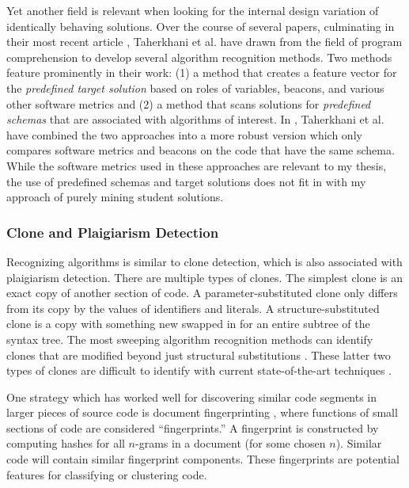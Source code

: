 Yet another field is relevant when looking for the internal design variation of identically behaving solutions. Over the course of several papers, culminating in their most recent article \cite{taherkhani13}, Taherkhani et al. have drawn from the field of program comprehension to develop several algorithm recognition methods. Two methods feature prominently in their work: (1) a method that creates a feature vector for the \emph{predefined target solution} based on roles of variables, beacons, and various other software metrics and (2) a method that scans solutions for \emph{predefined schemas} that are associated with algorithms of interest. In \cite{taherkhani13}, Taherkhani et al. have combined the two approaches into a more robust version which only compares software metrics and beacons on the code that have the same schema. While the software metrics used in these approaches are relevant to my thesis, the use of predefined schemas and target solutions does not fit in with my approach of purely mining student solutions.

\subsubsection{Clone and Plaigiarism Detection}

Recognizing algorithms is similar to clone detection, which is also associated with plaigiarism detection. There are multiple types of clones. The simplest clone is an exact copy of another section of code. A parameter-substituted clone only differs from its copy by the values of identifiers and literals. A structure-substituted clone is a copy with something new swapped in for an entire subtree of the syntax tree. The most sweeping algorithm recognition methods can identify clones that are modified beyond just structural substitutions \cite{tiarks2011extended}. These latter two types of clones are difficult to identify with current state-of-the-art techniques \cite{taherkhani12, taherkhani13}. 

One strategy which has worked well for discovering similar code segments in larger pieces of source code is document fingerprinting \cite{schleimer2003winnowing}, where functions of small sections of code are considered ``fingerprints.'' A fingerprint is constructed by computing hashes for all $n$-grams in a document (for some chosen $n$). Similar code will contain similar fingerprint components. These fingerprints are potential features for classifying or clustering code.



